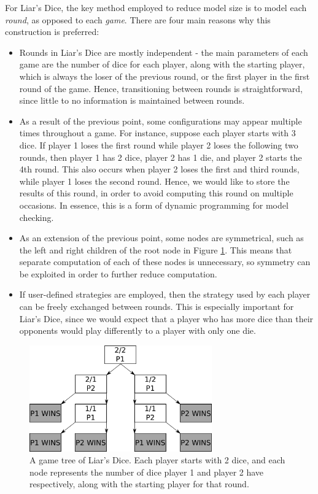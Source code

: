 For Liar's Dice, the key method employed to reduce model size is to model each \emph{round}, as opposed to each \emph{game}. There are four main reasons why this construction is preferred:

\begin{itemize}
    \item Rounds in Liar's Dice are mostly independent - the main parameters of each game are the number of dice for each player, along with the starting player, which is always the loser of the previous round, or the first player in the first round of the game. Hence, transitioning between rounds is straightforward, since little to no information is maintained between rounds.
    \item As a result of the previous point, some configurations may appear multiple times throughout a game. For instance, suppose each player starts with 3 dice. If player 1 loses the first round while player 2 loses the following two rounds, then player 1 has 2 dice, player 2 has 1 die, and player 2 starts the 4th round. This also occurs when player 2 loses the first and third rounds, while player 1 loses the second round. Hence, we would like to store the results of this round, in order to avoid computing this round on multiple occasions. In essence, this is a form of dynamic programming for model checking.
    \item As an extension of the previous point, some nodes are symmetrical, such as the left and right children of the root node in Figure \ref{cs2:2_dice_game_tree}. This means that separate computation of each of these nodes is unnecessary, so symmetry can be exploited in order to further reduce computation.
    \item If user-defined strategies are employed, then the strategy used by each player can be freely exchanged between rounds. This is especially important for Liar's Dice, since we would expect that a player who has more dice than their opponents would play differently to a player with only one die.
\end{itemize}

\begin{figure}[h]
    \centering
    \includegraphics[width=0.7\textwidth]{images/LiarsDice/2_dice_game_tree.pdf}
    \caption{A game tree of Liar's Dice. Each player starts with 2 dice, and each node represents the number of dice player 1 and player 2 have respectively, along with the starting player for that round.}
    \label{cs2:2_dice_game_tree}
\end{figure}

